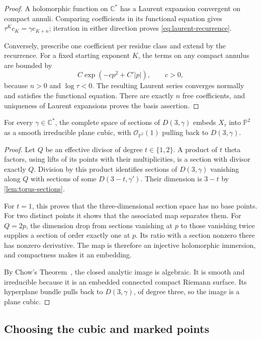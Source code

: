 \begin{proof}
A holomorphic function on $\mathbb{C}^*$ has a Laurent expansion convergent on compact annuli. Comparing coefficients in its functional equation gives $\tau^Kc_K=\gamma c_{K+n}$; iteration in either direction proves \eqref{eq:laurent-recurrence}.

Conversely, prescribe one coefficient per residue class and extend by the recurrence. For a fixed starting exponent $K$, the terms on any compact annulus are bounded by
\[
 C\exp(-c p^2+C'|p|),\qquad c>0,
\]
because $n>0$ and $\log\tau<0$. The resulting Laurent series converges normally and satisfies the functional equation. There are exactly $n$ free coefficients, and uniqueness of Laurent expansions proves the basis assertion.
\end{proof}

\begin{lemma}
\label{lem:cubic-embedding}
For every $\gamma\in\mathbb{C}^*$, the complete space of sections of $D(3,\gamma)$ embeds $X_\tau$ into $\mathbb{P}^2$ as a smooth irreducible plane cubic, with $\mathcal{O}_{\mathbb{P}^2}(1)$ pulling back to $D(3,\gamma)$.
\end{lemma}

\begin{proof}
Let $Q$ be an effective divisor of degree $t\in\{1,2\}$. A product of $t$ theta factors, using lifts of its points with their multiplicities, is a section with divisor exactly $Q$. Division by this product identifies sections of $D(3,\gamma)$ vanishing along $Q$ with sections of some $D(3-t,\gamma')$. Their dimension is $3-t$ by \cref{lem:torus-sections}.

For $t=1$, this proves that the three-dimensional section space has no base points. For two distinct points it shows that the associated map separates them. For $Q=2p$, the dimension drop from sections vanishing at $p$ to those vanishing twice supplies a section of order exactly one at $p$. Its ratio with a section nonzero there has nonzero derivative. The map is therefore an injective holomorphic immersion, and compactness makes it an embedding.

By Chow's Theorem~\cite{Chow1949}, the closed analytic image is algebraic. It is smooth and irreducible because it is an embedded connected compact Riemann surface. Its hyperplane bundle pulls back to $D(3,\gamma)$, of degree three, so the image is a plane cubic.
\end{proof}

\subsection{Choosing the cubic and marked points}

